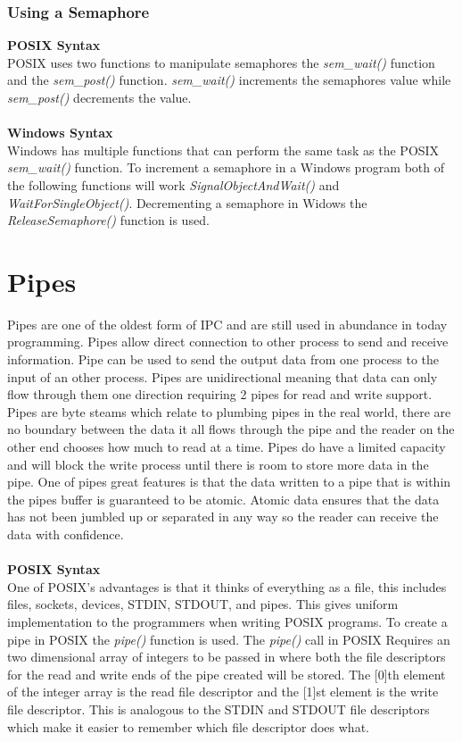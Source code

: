 \documentclass[letterpaper,10pt,notitlepage,fleqn]{article}
\begin{document}
\subsubsection{Using a Semaphore}
\textbf{POSIX Syntax} \\
POSIX uses two functions to manipulate semaphores the \textit{sem\_wait()} function and the \textit{sem\_post()} function. \textit{sem\_wait()} increments the semaphores value while \textit{sem\_post()} decrements the value. \\ \\

\textbf{Windows Syntax} \\
Windows has multiple functions that can perform the same task as the POSIX \textit{sem\_wait()} function. To increment a semaphore in a Windows program both of the following functions will work \textit{SignalObjectAndWait()} and \textit{WaitForSingleObject()}. Decrementing a semaphore in Widows the \textit{ReleaseSemaphore()} function is used.

\section{Pipes}
Pipes are one of the oldest form of IPC and are still used in abundance in today programming. Pipes allow direct connection to other process to send and receive information. Pipe can be used to send the output data from one process to the input of an other process. Pipes are unidirectional meaning that data can only flow through them one direction requiring 2 pipes for read and write support. Pipes are byte steams which relate to plumbing pipes in the real world, there are no boundary between the data it all flows through the pipe and the reader on the other end chooses how much to read at a time. Pipes do have a limited capacity and will block the write process until there is room to store more data in the pipe. One of pipes great features is that the data written to a pipe that is within the pipes buffer is guaranteed to be atomic. Atomic data ensures that the data has not been jumbled up or separated in any way  so the reader can receive the data with confidence. \\ \\

\textbf{POSIX Syntax} \\
One of POSIX's advantages is that it thinks of everything as a file, this includes files, sockets, devices, STDIN, STDOUT, and pipes. This gives uniform implementation to the programmers when writing POSIX programs. To create a pipe in POSIX the \textit{pipe()} function is used. The \textit{pipe()} call in POSIX Requires an two dimensional array of integers to be passed in where both the file descriptors for the read and write ends of the pipe created will be stored. The [0]th element of the integer array is the read file descriptor and the [1]st element is the write file descriptor. This is analogous to the STDIN and STDOUT file descriptors which make it easier to remember which file descriptor does what. \\ \\
\end{document}
